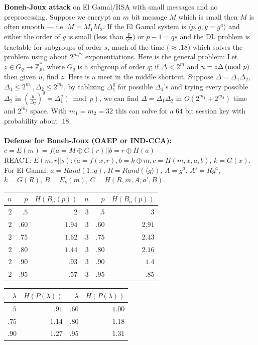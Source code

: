 {\bf Boneh-Joux attack} on El Gamal/RSA with small messages and no preprocessing.
Suppose we encrypt an $m$ bit message $M$ which is small then 
$M$ is often smooth --- i.e. $M=M_1M_2$.  
If the El Gamal system is $\langle p, g, y=g^a \rangle$
and either the order of $g$ is small (less than ${\frac p {2^m}}$)
or $p-1=qs$ and the DL problem is tractable for subgroups of order $s$,
much of the time ($\approx .18$) which solves the problem using about $2^{m/2}$
exponentiations.  Here is the general problem:
Let $z \in G_q \rightarrow {\mathbb Z}_p^*$, where
$G_q$ is a subgroup of order $q$; if $\Delta < 2^m$ and $u = z \Delta \thinspace \textnormal{(mod } p \textnormal{)}$ then
given $u$, find $z$.  Here is a meet in the middle shortcut.  Suppose 
$\Delta= \Delta_1 \Delta_2$, $\Delta_1 \le 2^{m_1}, \Delta_2 \le 2^{m_2}$, by tablizing
$\Delta_1^q$ for possible $\Delta_1$'s and trying every possible
$\Delta_2$ in $({\frac u {\Delta_2}})^q= \Delta_1^q (\bmod{p})$, we
can find $\Delta= \Delta_1 \Delta_2$ in $O(2^{m_1}+2^{m_2})$ time and
$2^{m_1}$ space.  With $m_1=m_2=32$ this can solve for a $64$ bit session
key with probability about $.18$.
\\
\\
{\bf Defense for Boneh-Joux (OAEP or IND-CCA):}
$c= E(m) = f(a= M \oplus G(r) || b=r \oplus H(a)$ \\
REACT:
$E(m, r||s): (a= f(x,r), b= k \oplus m, c= H(m,x,a,b)$, $k= G(x)$.
For El Gamal:
$a= Rand(1 .. q)$, $R= Rand(\langle g \rangle)$,
$A= g^a$, $A'= Rg^a$,
$k=G(R)$, $B=E_k(m)$, $C= H(R,m,A,a',B)$.
\begin{center}
\begin{tabular} {|rrr|rrr|}
\hline
$n$ & $p$ & $H(B_n(p))$ & $n$ & $p$ & $H(B_n(p))$\\
\hline
$2$ & $.5$ & $2$ & $3$ & $.5$ & $3$\\
$2$ & $.60$ & $1.94$ & $3$ & $.60$ & $2.91$\\
$2$ & $.75$ & $1.62$ & $3$ & $.75$ & $2.43$\\
$2$ & $.80$ & $1.44$ & $3$ & $.80$ & $2.16$\\
$2$ & $.90  $ & $.93$ & $3$ & $.90  $ & $1.4$\\
$2$ & $.95$ & $.57$ & $3$ & $.95$ & $.85$\\
\hline
\end{tabular}
\end{center}
\begin{center}
\begin{tabular} {|rr|rr|}
\hline
$\lambda$ & $H(P(\lambda))$ & $\lambda$ & $H(P(\lambda))$\\
\hline
$.5$ & $.91$ & $.60$ & $1.00$\\
$.75$ & $1.14$& $.80$ & $1.18$\\
$.90  $ & $1.27$ & $.95$ & $1.31$\\
\hline
\end{tabular}
\end{center}
